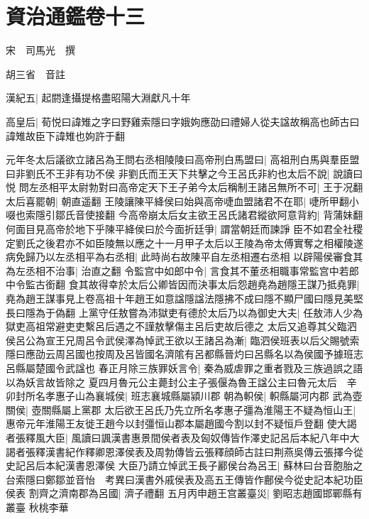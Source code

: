 \section{資治通鑑卷十三}
宋　司馬光　撰

胡三省　音註

漢紀五|{
	起閼逢攝提格盡昭陽大淵獻凡十年}


高皇后|{
	荀悦曰諱雉之字曰野雞索隱曰字娥姁應劭曰禮婦人從夫諡故稱高也師古曰諱雉故臣下諱雉也姁許于翻}


元年冬太后議欲立諸呂為王問右丞相陵陵曰高帝刑白馬盟曰|{
	高祖刑白馬與羣臣盟曰非劉氏不王非有功不侯}
非劉氏而王天下共擊之今王呂氏非約也太后不說|{
	說讀曰悦}
問左丞相平太尉勃對曰高帝定天下王子弟今太后稱制王諸呂無所不可|{
	王于况翻}
太后喜罷朝|{
	朝直遥翻}
王陵讓陳平絳侯曰始與高帝啑血盟諸君不在耶|{
	啑所甲翻小啜也索隱引鄒氏音使接翻}
今高帝崩太后女主欲王呂氏諸君縱欲阿意背約|{
	背蒲妹翻}
何面目見高帝於地下乎陳平絳侯曰於今面折廷爭|{
	謂當朝廷而諫諍}
臣不如君全社稷定劉氏之後君亦不如臣陵無以應之十一月甲子太后以王陵為帝太傅實奪之相權陵遂病免歸乃以左丞相平為右丞相|{
	此時尚右故陳平自左丞相遷右丞相}
以辟陽侯審食其為左丞相不治事|{
	治直之翻}
令監宫中如郎中令|{
	言食其不董丞相職事常監宫中若郎中令監古銜翻}
食其故得幸於太后公卿皆因而決事太后怨趙堯為趙隱王謀乃抵堯罪|{
	堯為趙王謀事見上卷高祖十年趙王如意諡隱諡法隱拂不成曰隱不顯尸國曰隱見美堅長曰隱為于偽翻}
上黨守任敖嘗為沛獄吏有德於太后乃以為御史大夫|{
	任敖沛人少為獄吏高祖常避吏吏繫呂后遇之不謹敖擊傷主呂后吏故后德之}
太后又追尊其父臨泗侯呂公為宣王兄周呂令武侯澤為悼武王欲以王諸呂為漸|{
	臨泗侯班表以后父賜號索隱曰應劭云周呂國也按周及呂皆國名濟隂有呂都縣晉灼曰呂縣名以為侯國予據班志呂縣屬楚國令武諡也}
春正月除三族罪妖言令|{
	秦為威虐罪之重者戮及三族過誤之語以為妖言故皆除之}
夏四月魯元公主薨封公主子張偃為魯王諡公主曰魯元太后　辛卯封所名孝惠子山為襄城侯|{
	班志襄城縣屬潁川郡}
朝為軹侯|{
	軹縣屬河内郡}
武為壺關侯|{
	壺關縣屬上黨郡}
太后欲王呂氏乃先立所名孝惠子彊為淮陽王不疑為恒山王|{
	惠帝元年淮陽王友徙王趙今以封彊恒山郡本屬趙國今割以封不疑恒戶登翻}
使大謁者張釋風大臣|{
	風讀曰諷漢書惠景間侯者表及匈奴傳皆作澤史記呂后本紀八年中大謁者張釋漢書紀作釋卿恩澤侯表及周勃傳皆云張釋顔師古註曰荆燕吳傳云張擇今從史記呂后本紀漢書恩澤侯}
大臣乃請立悼武王長子酈侯台為呂王|{
	蘇林曰台音胞胎之台索隱曰鄭鄒並音怡　考異曰漢書外戚侯表及高五王傳皆作鄜侯今從史記本紀功臣侯表}
割齊之濟南郡為呂國|{
	濟子禮翻}
五月丙申趙王宫叢臺災|{
	劉昭志趙國邯鄲縣有叢臺}
秋桃李華

